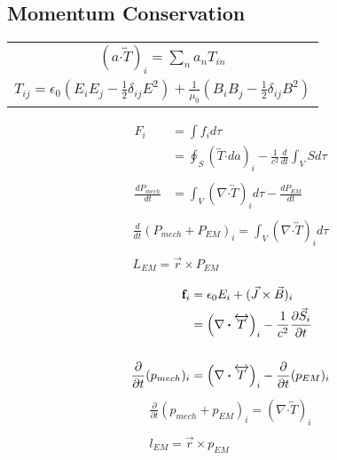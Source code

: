 \documentclass[12pt]{article}
\newcommand*{\dotP}{\boldsymbol \cdot}		%
\begin{document}

\newpage
\subsection{Momentum Conservation}
\begin{tabular}{c}
	\( \left( a \dotP \overleftrightarrow T \right)_i  = \sum_n a_n T_{in} \) \\[20pt]
	\( T_{ij} = \epsilon_0 \left( E_i E_j - \frac{1}{2} \delta_{ij} E^2 \right) 
		+ \frac{1}{\mu_0} \left( B_i B_j - \frac{1}{2} \delta_{ij} B^2 \right) \) 
\end{tabular}

\begin{center}
\begin{minipage}{0.3\textwidth}
	\begin{align*}
		F_i &= \int f_i d\tau \\
		&= \oint_S \left( \overleftrightarrow T \dotP da \right)_i 
			- \frac{1}{c^2}\frac{d}{dt}\int_V S d\tau \\ \\ 
		\frac{ dP_{mech} }{dt} &= \int_V \left( \nabla \dotP \overleftrightarrow T \right)_i d\tau 
			- \frac{dP_{EM}}{dt} \\
	\end{align*}
	\begin{gather*}
		\frac{d}{dt} (P_{mech} + P_{EM})_i 
			= \int_V \left( \nabla \dotP \overleftrightarrow T \right)_i d\tau \\ \\
		L_{EM} = \vec{r} \times P_{EM}		
	\end{gather*}
\end{minipage}
\hspace{0.1\textwidth}
\begin{minipage}{0.3\textwidth}
	\begin{align*}
		{\bf f}_i &= \epsilon_0 E_i + (\vec{J} \times \vec{B})_i \\
		&= \left( \nabla \dotP \overleftrightarrow T \right)_i 
			- \frac{1}{c^2} \frac{\partial \vec{S}_i}{\partial t} \\ \\
		\frac{\partial}{\partial t} (p_{mech})_i 
			&= \left( \nabla \dotP \overleftrightarrow T \right)_i 
			- \frac{\partial}{\partial t} (p_{EM})_i \\
	\end{align*}
	\begin{gather*}
		\frac{\partial}{\partial t} (p_{mech} + p_{EM})_i 
			= \left( \nabla \dotP \overleftrightarrow T \right)_i \\ \\
		l_{EM} = \vec{r} \times p_{EM}
	\end{gather*}
\end{minipage}
\end{center}
\end{document}
